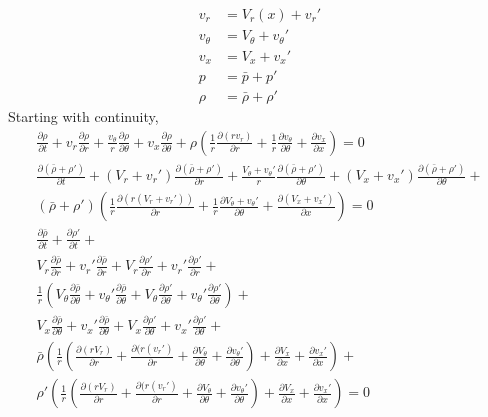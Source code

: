 \documentclass[12pt]{article}
\begin{document}
\begin{align}
v_r 		&= V_r(x) + v_r'\\
v_{\theta} 	&= V_{\theta} + v_{\theta}'\\
v_x 		&= V_x + v_x'\\
p 			&= \bar{p} + p'\\
\rho 		&= \bar{\rho} + \rho'
\end{align}
\newpage
Starting with continuity,
\begin{equation*} 
\end{equation*}
\begin{align*}
	\frac{\partial \rho}{\partial t} + 
v_r \frac{\partial \rho}{\partial r} +
\frac{v_{\theta}   }{r}
\frac{\partial \rho}{\partial \theta} +
v_x \frac{\partial \rho}{\partial \theta} + 
\rho 
\left(
\frac{1}{r} \frac{\partial (rv_r)	}{\partial r} +
\frac{1}{r}	\frac{\partial v_{\theta}}{\partial \theta} +
\frac{\partial v_x}{\partial x}
\right) 
= 0\\
\frac{\partial (\bar{\rho} + \rho') }{\partial t} +
(V_r + v_r') 
\frac{\partial (\bar{\rho} + \rho')}{\partial r} +
\frac{V_{\theta} + v_{\theta}'}{r}
\frac{\partial (\bar{\rho} + \rho')}{\partial \theta} +
(V_x + v_x') 
\frac{\partial (\bar{\rho} + \rho')}{\partial \theta} + \\ 
(\bar{\rho} + \rho') 
\left(
\frac{1}{r}\frac{\partial (r(V_r +v_r'))}{\partial r} +
\frac{1}{r}\frac{\partial V_{\theta}+v_{\theta}'}{\partial \theta} +
\frac{\partial (V_x + v_x')}{\partial x}
\right) = 0\\
\frac{\partial \bar{\rho}}{\partial t} + 
\frac{\partial \rho'     }{\partial t} +\\
V_r \frac{\partial \bar{\rho}}{\partial r} +  
v_r'\frac{\partial \bar{\rho}}{\partial r} + 
V_r \frac{\partial \rho'}{\partial r} +
v_r'\frac{\partial \rho'}{\partial r} + \\
\frac{1}{r}
\left(
V_{\theta} \frac{\partial \bar{\rho}}{\partial \theta} +
v_{\theta}'\frac{\partial \bar{\rho}}{\partial \theta} + 
V_{\theta} \frac{\partial \rho'		}{\partial \theta} + 
v_{\theta}'\frac{\partial \rho'		}{\partial \theta}
\right) + \\ 
V_x \frac{\partial \bar{\rho}}{\partial \theta} + 
v_x'\frac{\partial \bar{\rho}}{\partial \theta} +
V_x \frac{\partial \rho'	 }{\partial \theta} 	+
v_x'\frac{\partial \rho'    }{\partial \theta}		+\\
\bar{\rho} 
\left(
\frac{1}{r}
\left(
\frac{\partial (rV_r  )    }{\partial r} +
\frac{\partial (r(v_r')    }{\partial r} +
\frac{\partial V_{\theta}  }{\partial \theta} +
\frac{\partial v_{\theta}' }{\partial \theta}
\right) +
\frac{\partial V_x }{\partial x} +
\frac{\partial v_x'}{\partial x}
\right) + \\
\rho'
\left(
\frac{1}{r}
\left(
\frac{\partial (rV_r  )    }{\partial r} +
\frac{\partial (r(v_r')    }{\partial r} +
\frac{\partial V_{\theta}  }{\partial \theta} +
\frac{\partial v_{\theta}' }{\partial \theta}
\right) +
\frac{\partial V_x }{\partial x} +
\frac{\partial v_x'}{\partial x}
\right)
= 0	\\
\end{align*}
\end{document}
